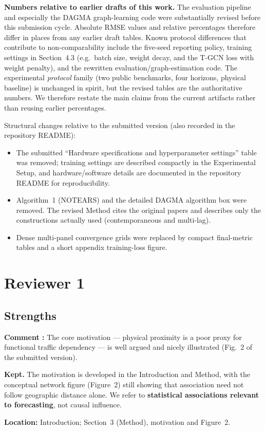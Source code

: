 \documentclass[a4paper,11pt]{article}
\newcounter{commentcounter}
\newcommand{\reviewercomment}[1]{%
    \stepcounter{commentcounter}%
    \begin{reviewerscomment}
        \textbf{Comment \arabic{commentcounter}:} #1
    \end{reviewerscomment}
}
\newcommand{\response}[1]{%
    \begin{myresponse}
        #1
    \end{myresponse}
    \vspace{5mm}
}
\begin{document}
\textbf{Numbers relative to earlier drafts of this work.} The evaluation pipeline and especially the DAGMA graph-learning code were substantially revised before this submission cycle. Absolute RMSE values and relative percentages therefore differ in places from any earlier draft tables. Known protocol differences that contribute to non-comparability include the five-seed reporting policy, training settings in Section~4.3 (e.g.\ batch size, weight decay, and the T-GCN loss with weight penalty), and the rewritten evaluation/graph-estimation code. The experimental \emph{protocol} family (two public benchmarks, four horizons, physical baseline) is unchanged in spirit, but the revised tables are the authoritative numbers. We therefore restate the main claims from the current artifacts rather than reusing earlier percentages.

Structural changes relative to the submitted version (also recorded in the repository README):
\begin{itemize}
    \item The submitted ``Hardware specifications and hyperparameter settings'' table was removed; training settings are described compactly in the Experimental Setup, and hardware/software details are documented in the repository README for reproducibility.
    \item Algorithm~1 (NOTEARS) and the detailed DAGMA algorithm box were removed. The revised Method cites the original papers and describes only the constructions actually used (contemporaneous and multi-lag).
    \item Dense multi-panel convergence grids were replaced by compact final-metric tables and a short appendix training-loss figure.
\end{itemize}
\section{Reviewer 1}
\subsection{Strengths}

\reviewercomment{
The core motivation --- physical proximity is a poor proxy for functional traffic dependency --- is well argued and nicely illustrated (Fig.~2 of the submitted version).
}

\response{
\textbf{Kept.} The motivation is developed in the Introduction and Method, with the conceptual network figure (Figure~2) still showing that association need not follow geographic distance alone. We refer to \textbf{statistical associations relevant to forecasting}, not causal influence.

\textbf{Location:} Introduction; Section~3 (Method), motivation and Figure~2.
}
\end{document}
